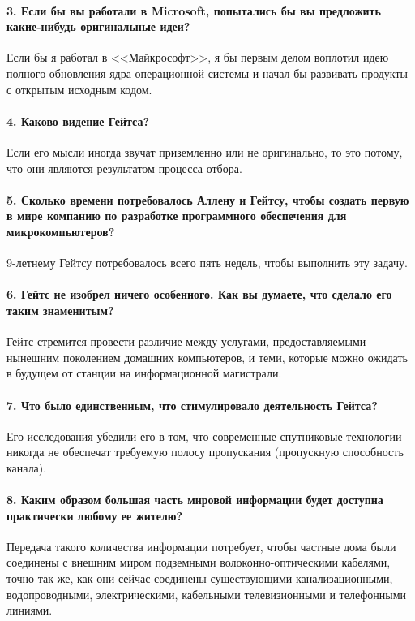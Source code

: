 \documentclass[a5paper, 12pt, twoside]{extreport}
\begin{document}
    \paragraph{3. Если бы вы работали в Microsoft, попытались бы вы предложить какие-нибудь оригинальные идеи?}
    Если бы я работал в <<Майкрософт>>, я бы первым делом воплотил идею полного обновления ядра операционной системы и начал бы развивать продукты с открытым исходным кодом.
    
    \paragraph{4. Каково видение Гейтса?}
    Если его мысли иногда звучат приземленно или не оригинально, то это потому, что они являются результатом процесса отбора.
    
    \paragraph{5. Сколько времени потребовалось Аллену и Гейтсу, чтобы создать первую в мире компанию по разработке программного обеспечения для микрокомпьютеров?}
    9-летнему Гейтсу потребовалось всего пять недель, чтобы выполнить эту задачу.
    
    \paragraph{6. Гейтс не изобрел ничего особенного. Как вы думаете, что сделало его таким знаменитым?}
    Гейтс стремится провести различие между услугами, предоставляемыми нынешним поколением домашних компьютеров, и теми, которые можно ожидать в будущем от станции на информационной магистрали.
    
    \paragraph{7. Что было единственным, что стимулировало деятельность Гейтса?}
    Его исследования убедили его в том, что современные спутниковые технологии никогда не обеспечат требуемую полосу пропускания (пропускную способность канала).
    
    \paragraph{8. Каким образом большая часть мировой информации будет доступна практически любому ее жителю?}
    Передача такого количества информации потребует, чтобы частные дома были соединены с внешним миром подземными волоконно-оптическими кабелями, точно так же, как они сейчас соединены существующими канализационными, водопроводными, электрическими, кабельными телевизионными и телефонными линиями.
    
\end{document}
